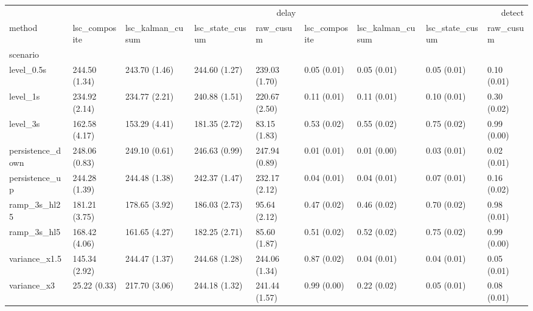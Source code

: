 \begin{tabular}{lllllllll}
\toprule
 & \multicolumn{4}{r}{delay} & \multicolumn{4}{r}{detect} \\
method & lsc_composite & lsc_kalman_cusum & lsc_state_cusum & raw_cusum & lsc_composite & lsc_kalman_cusum & lsc_state_cusum & raw_cusum \\
scenario &  &  &  &  &  &  &  &  \\
\midrule
level_0.5s & 244.50 (1.34) & 243.70 (1.46) & 244.60 (1.27) & 239.03 (1.70) & 0.05 (0.01) & 0.05 (0.01) & 0.05 (0.01) & 0.10 (0.01) \\
level_1s & 234.92 (2.14) & 234.77 (2.21) & 240.88 (1.51) & 220.67 (2.50) & 0.11 (0.01) & 0.11 (0.01) & 0.10 (0.01) & 0.30 (0.02) \\
level_3s & 162.58 (4.17) & 153.29 (4.41) & 181.35 (2.72) & 83.15 (1.83) & 0.53 (0.02) & 0.55 (0.02) & 0.75 (0.02) & 0.99 (0.00) \\
persistence_down & 248.06 (0.83) & 249.10 (0.61) & 246.63 (0.99) & 247.94 (0.89) & 0.01 (0.01) & 0.01 (0.00) & 0.03 (0.01) & 0.02 (0.01) \\
persistence_up & 244.28 (1.39) & 244.48 (1.38) & 242.37 (1.47) & 232.17 (2.12) & 0.04 (0.01) & 0.04 (0.01) & 0.07 (0.01) & 0.16 (0.02) \\
ramp_3s_hl25 & 181.21 (3.75) & 178.65 (3.92) & 186.03 (2.73) & 95.64 (2.12) & 0.47 (0.02) & 0.46 (0.02) & 0.70 (0.02) & 0.98 (0.01) \\
ramp_3s_hl5 & 168.42 (4.06) & 161.65 (4.27) & 182.25 (2.71) & 85.60 (1.87) & 0.51 (0.02) & 0.52 (0.02) & 0.75 (0.02) & 0.99 (0.00) \\
variance_x1.5 & 145.34 (2.92) & 244.47 (1.37) & 244.68 (1.28) & 244.06 (1.34) & 0.87 (0.02) & 0.04 (0.01) & 0.04 (0.01) & 0.05 (0.01) \\
variance_x3 & 25.22 (0.33) & 217.70 (3.06) & 244.18 (1.32) & 241.44 (1.57) & 0.99 (0.00) & 0.22 (0.02) & 0.05 (0.01) & 0.08 (0.01) \\
\bottomrule
\end{tabular}

